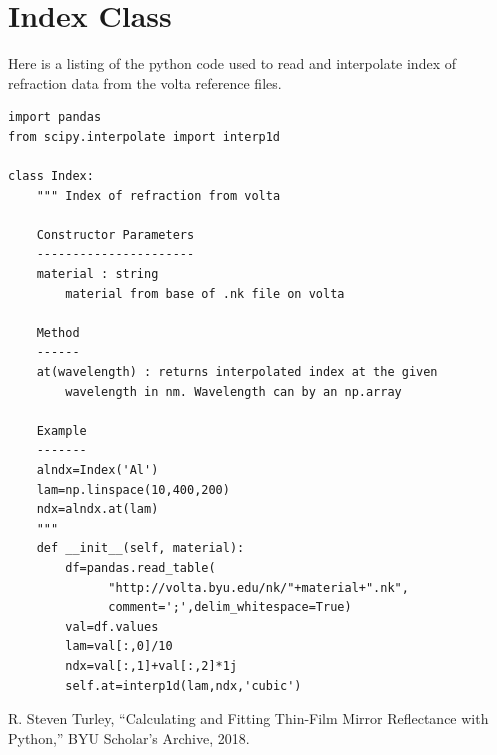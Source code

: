 \documentclass[english]{scrartcl}
\begin{document}
\section{Index Class\label{sec:Index}}
Here is a listing of the python code used to read and interpolate
index of refraction data from the volta reference files.
\begin{lstlisting}
import pandas
from scipy.interpolate import interp1d

class Index:
    """ Index of refraction from volta
    
    Constructor Parameters
    ----------------------
    material : string
        material from base of .nk file on volta
    
    Method
    ------
    at(wavelength) : returns interpolated index at the given
        wavelength in nm. Wavelength can by an np.array
    
    Example
    -------
    alndx=Index('Al')
    lam=np.linspace(10,400,200)
    ndx=alndx.at(lam)
    """
    def __init__(self, material):
        df=pandas.read_table(
              "http://volta.byu.edu/nk/"+material+".nk",
              comment=';',delim_whitespace=True)
        val=df.values
        lam=val[:,0]/10
        ndx=val[:,1]+val[:,2]*1j
        self.at=interp1d(lam,ndx,'cubic')

\end{lstlisting}

\begin{thebibliography}{9}
R. Steven Turley, ``Calculating and Fitting Thin-Film Mirror
Reflectance with Python,'' BYU Scholar's Archive, 2018.
\end{thebibliography}
\end{document}
